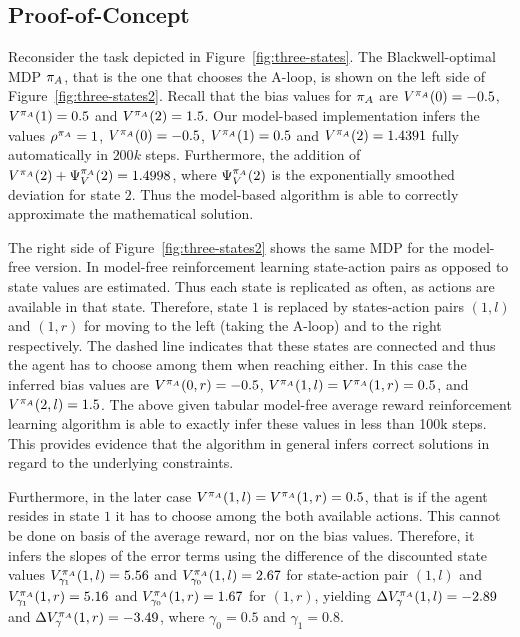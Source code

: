 \documentclass[envcountsame]{llncs}
\newcommand\MS[2][r]{\ifx t#1 \textcolor{blue}{[\textbf{MS:} #2]}
  \else \begin{center}\textcolor{blue}{\textbf{MS:} #2} \end{center} \fi}
\begin{document}
\subsection{Proof-of-Concept}
\label{subsec:Proof-of-Concept}

Reconsider the task depicted in Figure~\ref{fig:three-states}. The Blackwell-optimal MDP
\(\pi_{A}\), that is the one that chooses the A-loop, is shown on the left side of
Figure~\ref{fig:three-states2}. Recall that the bias values for \(\pi_{A}\) are
\(V^{\pi_{A}}(0)=-0.5\), \(V^{\pi_{A}}(1)=0.5\) and \(V^{\pi_{A}}(2)=1.5\). Our model-based
implementation infers the values \(\rho^{\pi_{A}} = 1\), \(V^{\pi_{A}}(0)=-0.5\), \(V^{\pi_{A}}(1)=0.5\)
and \(V^{\pi_{A}}(2)=1.4391\) fully automatically in \(200k\) steps. Furthermore, the addition of
\(V^{\pi_{A}}(2) + \Psi^{\pi_{A}}_{V}(2) = 1.4998\), where \(\Psi^{\pi_{A}}_{V}(2)\) is the exponentially
smoothed deviation for state \(2\). Thus the model-based algorithm is able to correctly approximate
the mathematical solution.

The right side of Figure~\ref{fig:three-states2} shows the same MDP for the model-free version. In
model-free reinforcement learning state-action pairs as opposed to state values are estimated. Thus
each state is replicated as often, as actions are available in that state. Therefore, state \(1\) is
replaced by states-action pairs \((1,l)\) and \((1,r)\) for moving to the left (taking the A-loop)
and to the right respectively. The dashed line indicates that these states are connected and thus
the agent has to choose among them when reaching either. In this case the inferred bias values are
\(V^{\pi_{A}}(0,r) = -0.5\), \(V^{\pi_{A}}(1,l)=V^{\pi_{A}}(1,r)=0.5\), and \(V^{\pi_{A}}(2,l)=1.5\). The above given tabular model-free
average reward reinforcement learning algorithm is able to exactly infer these values in less than
100k steps. This provides evidence that the algorithm in general infers correct solutions in regard to
the underlying constraints.


Furthermore, in the later case \(V^{\pi_{A}}(1,l)=V^{\pi_{A}}(1,r)=0.5\), that is if the agent
resides in state \(1\) it has to choose among the both available actions. This cannot be done on
basis of the average reward, nor on the bias values. Therefore, it infers the slopes of the error
terms using the difference of the discounted state values \(V^{\pi_{A}}_{\gamma_{1}}(1,l) = 5.56\)
and \(V^{\pi_{A}}_{\gamma_{0}}(1,l) = 2.67\) for state-action pair \((1,l)\) and
\(V^{\pi_{A}}_{\gamma_{1}}(1,r) = 5.16\) and \(V^{\pi_{A}}_{\gamma_{0}}(1,r) = 1.67\) for
\((1,r)\), yielding \(\Delta V^{\pi_{A}}_\gamma(1,l) = -2.89\) and
\(\Delta V^{\pi_{A}}_\gamma(1,r) = -3.49\), where \(\gamma_{0} = 0.5\) and \(\gamma_{1}=0.8\).
\end{document}
